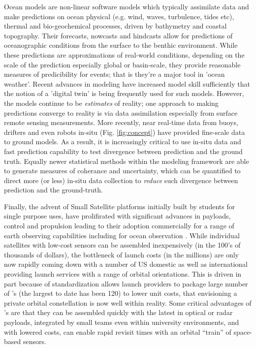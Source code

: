 Ocean models are non-linear software models which typically assimilate
data and make predictions on ocean physical (e.g. wind, waves,
turbulence, tides etc), thermal and bio-geochemical processes, driven
by bathymetry and coastal topography. Their forecasts, nowcasts and
hindcasts allow for predictions of oceanographic conditions from the
surface to the benthic environment. While these predictions are
approximations of real-world conditions, depending on the scale of the
prediction especially global or basin-scale, they provide reasonable
measures of predicibility for events; that is they're a major tool in
'ocean weather'. Recent advances in modeling have increased model
skill sufficiently that the notion of a 'digital twin' is being
frequently used for such models. However, the models continue to be
\emph{estimates} of reality; one approach to making predictions
converge to reality is via data assimilation especially from surface
remote sensing measurements. More recently, near real-time data from
buoys, drifters and even robots in-situ (Fig. \ref{fig:concept}) have
provided fine-scale data to ground models. As a result, it is
increasingly critical to use in-situ data and fast prediction
capability to test divergence between prediction and the ground
truth. Equally newer statistical methods \cite{lermusiaux06} within
the modeling framework are able to generate measures of coherance and
uncertainty, which can be quantified to direct more (or less) in-situ
data collection to \emph{reduce} such divergence between prediction
and the ground-truth.

Finally, the advent of Small Satellite platforms initially built by
students for single purpose uses, have prolifirated with significant
advances in payloads, control and propulsion leading to their adoption
commercially for a range of earth observing capabilities including for
ocean observation \cite{guerra16}. While individual satellites with
low-cost sensors can be assembled inexpensively (in the 100's of
thousands of dollars), the bottleneck of launch costs (in the
millions) are only now rapidly coming down with a number of US
domestic as well as international providing launch services with a
range of orbital orientations. This is driven in part because of
standardization allows launch providers to package large number of
\smle's (the largest to date has been 120) to lower unit costs, that
envisioning a private orbital constellation is now well within
reality. Some critical advantages of \smle's are that they can be
assembled quickly with the latest in optical or radar payloads,
integrated by small teams even within university environments, and
with lowered costs, can enable rapid revisit times with an orbital
``train'' of space-based sensors.

